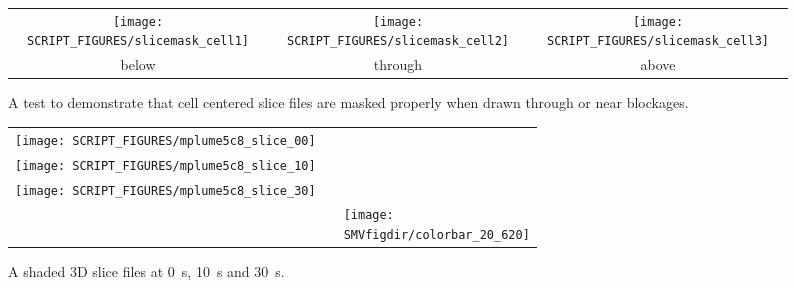 \documentclass[11pt,twoside]{book}
\begin{document}
\begin{figure}[bph]
\begin{center}
\begin{tabular}{ccc}
 \texttt{[image: SCRIPT\_FIGURES/slicemask\_cell1]}&
 \texttt{[image: SCRIPT\_FIGURES/slicemask\_cell2]}&
 \texttt{[image: SCRIPT\_FIGURES/slicemask\_cell3]}\\
 below&through&above
\end{tabular}
\end{center}
 \caption[A test to demonstrate that cell centered slice files are masked properly.]
 {A test to demonstrate that cell centered slice files are masked properly when drawn through or near blockages.}
\label{figslicecellmasktest}%
\end{figure}

\begin{figure}[bph]
\begin{center}
\begin{tabular}{ccp{1.0in}}
 \texttt{[image: SCRIPT\_FIGURES/mplume5c8\_slice\_00]}\\
 \texttt{[image: SCRIPT\_FIGURES/mplume5c8\_slice\_10]}\\
 \texttt{[image: SCRIPT\_FIGURES/mplume5c8\_slice\_30]}\\
&&\raisebox{0.5in}[0pt]{\texttt{[image: \\SMVfigdir/colorbar\_20\_620]}}\\
 \end{tabular}
\end{center}
 \caption[A shaded 3D slice files]{A shaded 3D slice files at \SI{0}{s}, \SI{10}{s} and \SI{30}{s}.}
\label{figslice3D}%
\end{figure}
\end{document}
